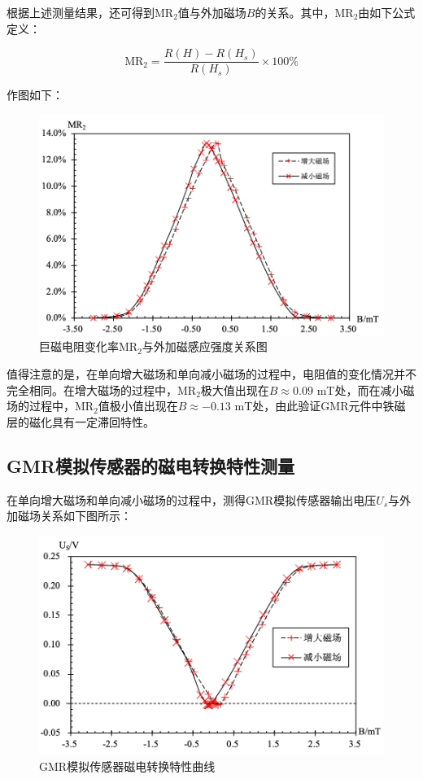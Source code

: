 \documentclass{thuemp}
\begin{document}
根据上述测量结果，还可得到$\mathrm{MR_2}$值与外加磁场$B$的关系。其中，$\mathrm{MR_2}$由如下公式定义：

\begin{equation}\label{eq:mr2}
    \mathrm{MR_2} = \frac{R(H) - R(H_s)}{R(H_s)} \times 100\%
\end{equation}

作图如下：
\begin{figure}[H]
    \centering
    \includegraphics[width=0.9\linewidth]{../Data/GMR-Plot-01-02-excel.png}
    \caption{巨磁电阻变化率$\mathrm{MR_2}$与外加磁感应强度关系图} \label{fig:magnetoresistance}
\end{figure}

值得注意的是，在单向增大磁场和单向减小磁场的过程中，电阻值的变化情况并不完全相同。在增大磁场的过程中，$\mathrm{MR_2}$极大值出现在$B\approx 0.09$ \si{\milli\tesla}处，而在减小磁场的过程中，$\mathrm{MR_2}$值极小值出现在$B\approx -0.13$ \si{\milli\tesla}处，由此验证GMR元件中铁磁层的磁化具有一定滞回特性。

\subsection{GMR模拟传感器的磁电转换特性测量}

在单向增大磁场和单向减小磁场的过程中，测得GMR模拟传感器输出电压$U_s$与外加磁场关系如下图所示：

\begin{figure}[H]
    \centering
    \includegraphics[width=0.9\linewidth]{../Data/GMR-Plot-02-excel.png}
    \caption{GMR模拟传感器磁电转换特性曲线} \label{fig:gmrsensor}
\end{figure}
\end{document}
